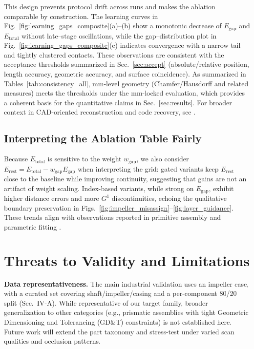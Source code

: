 \documentclass{ieeeaccess}
\begin{document}
This design prevents protocol drift across runs and makes the ablation
comparable by construction. The learning curves in
Fig.~\ref{fig:learning_gaps_composite}(a)–(b) show a monotonic decrease of
$E_{\text{gap}}$ and $E_{\text{total}}$ without late–stage oscillations,
while the gap–distribution plot in Fig.~\ref{fig:learning_gaps_composite}(c)
indicates convergence with a narrow tail and tightly clustered contacts.
These observations are consistent with the acceptance thresholds summarized in Sec.~\ref{sec:accept}
(absolute/relative position, length accuracy, geometric accuracy, and surface coincidence).
As summarized in Tables~\ref{tab:consistency_all}, mm-level geometry (Chamfer/Hausdorff and related measures) meets the thresholds
under the mm-locked evaluation, which provides a coherent basis for the quantitative claims in Sec.~\ref{sec:results}.
For broader context in CAD-oriented reconstruction and code recovery, see \cite{b2,b24}.


\subsection{Interpreting the Ablation Table Fairly}
Because $E_{\text{total}}$ is sensitive to the weight $w_{\text{gap}}$, we also consider
$E_{\text{rest}}=E_{\text{total}}-w_{\text{gap}}E_{\text{gap}}$ when interpreting the grid: gated
variants keep $E_{\text{rest}}$ close to the baseline while improving continuity,
suggesting that gains are not an artifact of weight scaling.
Index-based variants, while strong on $E_{\text{gap}}$, exhibit higher
distance errors and more $G^1$ discontinuities, echoing the
qualitative boundary preservation in Figs.~\ref{fig:impeller_misassign}–\ref{fig:layer_guidance}. These trends align with observations reported in primitive assembly and parametric fitting \cite{b14,b19}.

\section{Threats to Validity and Limitations}
\label{sec:limitations}

\textbf{Data representativeness.} The main industrial validation uses an
impeller case, with a curated set covering shaft/impeller/casing and a
per-component 80/20 split (Sec.~IV‑A). While representative of our
target family, broader generalization to other categories (e.g., prismatic
assemblies with tight Geometric Dimensioning and Tolerancing (GD\&T) constraints) is not established here. Future
work will extend the part taxonomy and stress-test under varied scan
qualities and occlusion patterns.
\end{document}
